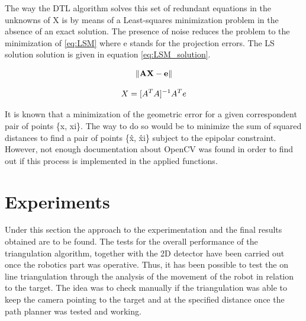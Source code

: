 The way the DTL algorithm solves this set of redundant equations in the unknowns of X is by means of a Least-squares minimization problem in the absence of an exact solution. 
The presence of noise reduces the problem to the minimization of \ref{eq:LSM} where e stands for the projection errors.
The LS solution solution is given in equation \ref{eq:LSM_solution}.

\begin{equation}
	\centering
	\lVert \mathbf{AX-e} \rVert 
	\label{eq:LSM}
\end{equation}

\begin{equation}
	\centering
	X = [A^{T}A]^{-1}A^{T}e
	\label{eq:LSM_solution}
\end{equation}

It is known that a minimization of the geometric error for a given correspondent pair of points \{x, xi\}. The way to do so would be to minimize the sum of squared distances to find a pair of points \{\^x, \^xi\} subject to the epipolar constraint. However, not enough documentation about OpenCV was found in order to find out if this process is implemented in the applied functions.

\section{Experiments}
Under this section the approach to the experimentation and the final results obtained are to be found.
The tests for the overall performance of the triangulation algorithm, together with the 2D detector have been carried out once the robotics part was operative. 
Thus, it has been possible to test the on line triangulation through the analysis of the movement of the robot in relation to the target. 
The idea was to check manually if the triangulation was able to keep the camera pointing to the target and at the specified distance once the path planner was tested and working.



  